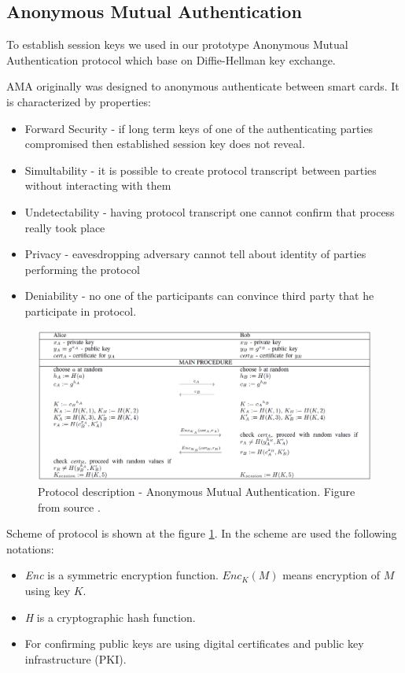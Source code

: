 \documentclass[11pt,titlepage]{article}
\theoremstyle{plain}
\begin{document}
\subsection{Anonymous Mutual Authentication}
To establish session keys we used in our prototype Anonymous Mutual Authentication protocol which base on Diffie-Hellman key exchange. 

\vspace{5mm}

AMA originally was designed to anonymous authenticate between smart cards. It is characterized by properties:
\begin{itemize}
\item Forward Security - if long term keys of one of the authenticating parties compromised then established session key does not reveal.
\item Simultability - it is possible to create protocol transcript between parties without interacting with them
\item Undetectability - having protocol transcript one cannot confirm that process really took place
\item Privacy - eavesdropping adversary cannot tell about identity of parties performing the protocol
\item Deniability - no one of the participants can convince third party that he participate in protocol.
\end{itemize}

\begin{figure}[H]
	\centering
	\includegraphics[width=1.2\textwidth]{img/AMA_protocol}
	\caption{Protocol description - Anonymous Mutual Authentication. Figure from source \cite{AMA}.}
	\label{fig:F8}
\end{figure}

Scheme of protocol is shown at the figure \ref{fig:F8}. In the scheme are used the following notations:
\begin{itemize}
\item \textit{Enc} is a symmetric encryption function. \textit{$Enc_K(M)$} means encryption of $M$ using key $K$. 
\item \textit{H} is a cryptographic hash function. 
\item For confirming public keys are using digital certificates and public key infrastructure (PKI).
\end{itemize}
\end{document}
